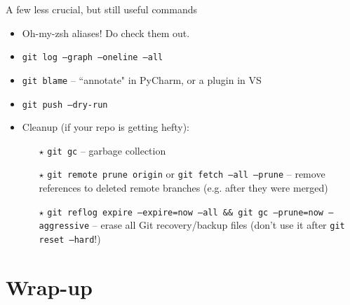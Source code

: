 \documentclass{beamer}
\begin{document}
    \begin{frame}{A few less crucial, but still useful commands}

        \begin{itemize}
            \item Oh-my-zsh aliases! Do check them out. \href{https://github.com/ohmyzsh/ohmyzsh/wiki/Cheatsheet\#git}{}
            \item \texttt{git log --graph --oneline --all}
            \item \texttt{git blame} -- ``annotate" in PyCharm, or a plugin in VS
            \item \texttt{git push --dry-run}
            \item Cleanup (if your repo is getting hefty):
                \begin{itemize}
                    \item[$\star$] \texttt{git gc} -- garbage collection
                    \item[$\star$] \texttt{git remote prune origin} or \texttt{git fetch --all --prune} -- remove
                        references to deleted remote branches (e.g. after they were merged)
                    \item[$\star$] \texttt{git reflog expire --expire=now --all \&\& git gc --prune=now --aggressive}
                        -- erase all Git recovery/backup files (don't use it after \texttt{git reset --hard}!)
                \end{itemize}
        \end{itemize}

    \end{frame}



    \section{Wrap-up}
\end{document}
